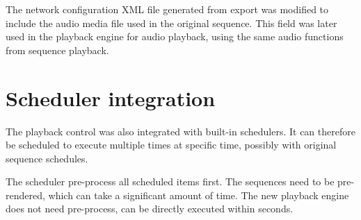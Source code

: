 The network configuration XML file generated from export was modified to include the audio media file used in the original sequence. This field was later used in the playback engine for audio playback, using the same audio functions from sequence playback. 

\section{Scheduler integration}

The playback control was also integrated with built-in schedulers. It can therefore be scheduled to execute multiple times at specific time, possibly with original sequence schedules. 


The scheduler pre-process all scheduled items first. The sequences need to be pre-rendered, which can take a significant amount of time. The new playback engine does not need pre-process, can be directly executed within seconds.
